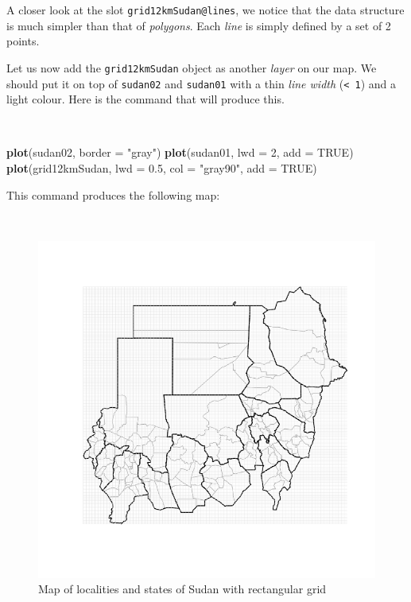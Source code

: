 \documentclass[12pt,a4paper,a4paper]{book}
\newenvironment{Shaded}{\begin{snugshade}}{\end{snugshade}}
\newcommand{\KeywordTok}[1]{\textcolor[rgb]{0.13,0.29,0.53}{\textbf{#1}}}
\newcommand{\DataTypeTok}[1]{\textcolor[rgb]{0.13,0.29,0.53}{#1}}
\newcommand{\DecValTok}[1]{\textcolor[rgb]{0.00,0.00,0.81}{#1}}
\newcommand{\FloatTok}[1]{\textcolor[rgb]{0.00,0.00,0.81}{#1}}
\newcommand{\StringTok}[1]{\textcolor[rgb]{0.31,0.60,0.02}{#1}}
\newcommand{\OtherTok}[1]{\textcolor[rgb]{0.56,0.35,0.01}{#1}}
\newcommand{\NormalTok}[1]{#1}
\theoremstyle{definition}
\theoremstyle{definition}
\theoremstyle{definition}
\theoremstyle{remark}
\begin{document}
A closer look at the slot \texttt{grid12kmSudan@lines}, we notice that
the data structure is much simpler than that of \emph{polygons}. Each
\emph{line} is simply defined by a set of 2 points.

Let us now add the \texttt{grid12kmSudan} object as another \emph{layer}
on our map. We should put it on top of \texttt{sudan02} and
\texttt{sudan01} with a thin \emph{line width} (\texttt{\textless{}\ 1})
and a light colour. Here is the command that will produce this.

~

\begin{Shaded}
\begin{Highlighting}[]
\KeywordTok{plot}\NormalTok{(sudan02, }\DataTypeTok{border =} \StringTok{"gray"}\NormalTok{)}
\KeywordTok{plot}\NormalTok{(sudan01, }\DataTypeTok{lwd =} \DecValTok{2}\NormalTok{, }\DataTypeTok{add =} \OtherTok{TRUE}\NormalTok{)}
\KeywordTok{plot}\NormalTok{(grid12kmSudan, }\DataTypeTok{lwd =} \FloatTok{0.5}\NormalTok{, }\DataTypeTok{col =} \StringTok{"gray90"}\NormalTok{, }\DataTypeTok{add =} \OtherTok{TRUE}\NormalTok{)}
\end{Highlighting}
\end{Shaded}

\newpage

This command produces the following map:

~

\begin{figure}[H]

{\centering \includegraphics{figures/map4-1} 

}

\caption{Map of localities and states of Sudan with rectangular grid}\label{fig:map4}
\end{figure}
\end{document}
